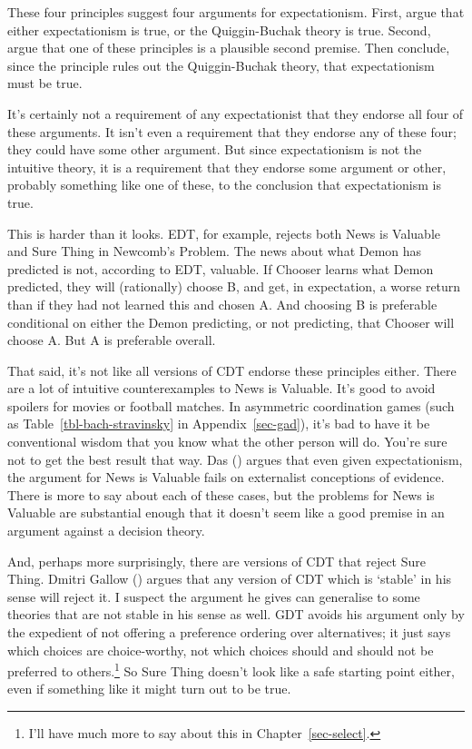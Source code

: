 \documentclass[
  12pt,
  letterpaper,
  DIV=11,
  numbers=noendperiod]{scrreprt}
\begin{document}
These four principles suggest four arguments for expectationism. First,
argue that either expectationism is true, or the Quiggin-Buchak theory
is true. Second, argue that one of these principles is a plausible
second premise. Then conclude, since the principle rules out the
Quiggin-Buchak theory, that expectationism must be true.

It's certainly not a requirement of any expectationist that they endorse
all four of these arguments. It isn't even a requirement that they
endorse any of these four; they could have some other argument. But
since expectationism is not the intuitive theory, it is a requirement
that they endorse some argument or other, probably something like one of
these, to the conclusion that expectationism is true.

This is harder than it looks. EDT, for example, rejects both News is
Valuable and Sure Thing in Newcomb's Problem. The news about what Demon
has predicted is not, according to EDT, valuable. If Chooser learns what
Demon predicted, they will (rationally) choose B, and get, in
expectation, a worse return than if they had not learned this and chosen
A. And choosing B is preferable conditional on either the Demon
predicting, or not predicting, that Chooser will choose A. But A is
preferable overall.

That said, it's not like all versions of CDT endorse these principles
either. There are a lot of intuitive counterexamples to News is
Valuable. It's good to avoid spoilers for movies or football matches. In
asymmetric coordination games (such as Table~\ref{tbl-bach-stravinsky}
in Appendix~\ref{sec-gad}), it's bad to have it be conventional wisdom
that you know what the other person will do. You're sure not to get the
best result that way. Das () argues that
even given expectationism, the argument for News is Valuable fails on
externalist conceptions of evidence. There is more to say about each of
these cases, but the problems for News is Valuable are substantial
enough that it doesn't seem like a good premise in an argument against a
decision theory.

And, perhaps more surprisingly, there are versions of CDT that reject
Sure Thing. Dmitri Gallow () argues that
any version of CDT which is `stable' in his sense will reject it. I
suspect the argument he gives can generalise to some theories that are
not stable in his sense as well. GDT avoids his argument only by the
expedient of not offering a preference ordering over alternatives; it
just says which choices are choice-worthy, not which choices should and
should not be preferred to others.\footnote{I'll have much more to say
  about this in Chapter~\ref{sec-select}.} So Sure Thing doesn't look
like a safe starting point either, even if something like it might turn
out to be true.
\end{document}
